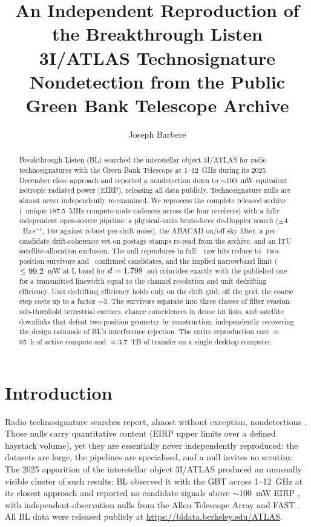 \documentclass[twocolumn]{aastex631}
\begin{document}
\title{An Independent Reproduction of the Breakthrough Listen 3I/ATLAS Technosignature
Nondetection from the Public Green Bank Telescope Archive}
\author[0009-0008-3289-4447]{Joseph Barbere}

\begin{abstract}
Breakthrough Listen (BL) searched the interstellar object 3I/ATLAS for radio
technosignatures with the Green Bank Telescope at 1--12~GHz during its 2025 December
close approach and reported a nondetection down to $\sim$100~mW equivalent isotropic
radiated power (EIRP), releasing all data publicly. Technosignature nulls are almost
never independently re-examined. We reprocess the complete released archive
(\aiTotNodes\ unique 187.5~MHz compute-node cadences across the four receivers) with
a fully independent open-source pipeline: a physical-units brute-force de-Doppler search
($\pm4$~Hz\,s$^{-1}$, $16\sigma$ against robust per-drift noise), the ABACAD on/off sky
filter, a per-candidate drift-coherence vet on postage stamps re-read from the archive,
and an ITU satellite-allocation exclusion. The null reproduces in full: \aiTotRawHits\
raw hits reduce to \aiTotSurvivors\ two-position survivors and \aiTotConfirmed\
confirmed candidates, and the implied narrowband limit ($\le99.2$~mW at L band for
$d=1.798$~au) coincides exactly with the published one for a transmitted
linewidth equal to the channel resolution and unit dedrifting efficiency. Unit
dedrifting efficiency holds only on the drift grid; off the grid, the coarse step costs up to a
factor $\sim$3. The survivors separate into three classes of filter evasion:
sub-threshold terrestrial carriers, chance coincidences in dense hit lists, and
satellite downlinks that defeat two-position geometry by construction,
independently recovering the design rationale of BL's interference rejection. The entire reproduction
cost $\approx$95~h of active compute and $\approx$3.7~TB of transfer on a single
desktop computer.
\end{abstract}


\section{Introduction}
Radio technosignature searches report, almost without exception, nondetections
\citep[e.g.][]{gajjar2021,choza2024}. Those nulls carry quantitative content (EIRP
upper limits over a defined haystack volume), yet they are essentially never
independently reproduced: the datasets are large, the pipelines are specialised, and a
null invites no scrutiny. The 2025 apparition of the interstellar object 3I/ATLAS
produced an unusually visible cluster of such results: BL observed it with the GBT
across 1--12~GHz at its closest approach and reported no candidate signals above
$\sim$100~mW EIRP \citep{jacobsonbell2025}, with independent-observation nulls
from the Allen Telescope Array \citep{ata3i} and FAST \citep{fast3i}. All BL data were
released publicly at \url{https://bldata.berkeley.edu/ATLAS}.
\end{document}
